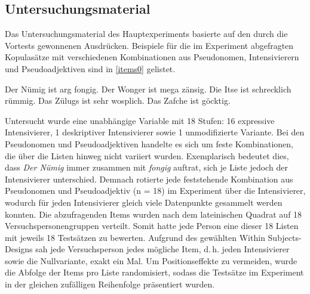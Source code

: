 \subsection{Untersuchungsmaterial}\label{abs:Untersuchungsmaterial}
Das Untersuchungsmaterial des Hauptexperiments basierte auf den durch die Vortests gewonnenen Ausdrücken. Beispiele für die im Experiment abgefragten Kopulasätze mit verschiedenen Kombinationen aus Pseudonomen, Intensivierern und Pseudoadjektiven sind in \ref{items0} gelistet.

\ea   \label{items0}
\ea Der Nümig ist arg fongig.
\ex Der Wonger ist mega zänsig.
\ex Die Itse ist schrecklich rümmig.
\ex Das Zülugs ist sehr wosplich.
\ex Das Zafche ist göcktig.
\z
\z

\noindent Untersucht wurde eine unabhängige Variable mit 18 Stufen: 16 expressive Intensivierer, 1 deskriptiver Intensivierer sowie 1 unmodifizierte Variante. Bei den Pseudonomen und Pseudoadjektiven handelte es sich um feste Kombinationen, die über die Listen hinweg nicht variiert wurden. Exemplarisch bedeutet dies, dass \textit{Der Nümig} immer zusammen mit \textit{fongig} auftrat, sich je Liste jedoch der Intensivierer unterschied. Demnach rotierte jede feststehende Kombination aus Pseudonomen und Pseudoadjektiv (n = 18) im Experiment über die Intensivierer, wodurch für jeden Intensivierer gleich viele Datenpunkte gesammelt werden konnten. %
Die abzufragenden Items wurden nach dem lateinischen Quadrat auf 18 Versuchspersonengruppen verteilt. Somit hatte jede Person eine dieser 18 Listen mit jeweils 18 Testsätzen zu bewerten. Aufgrund des gewählten Within Subjects-Designs sah jede Versuchsperson jedes mögliche Item, d.\,h. jeden Intensivierer sowie die Nullvariante, exakt ein Mal. Um Positionseffekte zu vermeiden, wurde die Abfolge der Items pro Liste randomisiert, sodass die Testsätze im Experiment in der gleichen zufälligen Reihenfolge präsentiert wurden.


